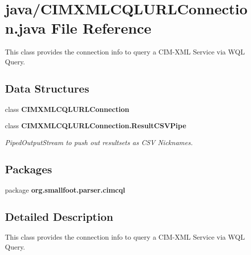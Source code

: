 \section{java/\+C\+I\+M\+X\+M\+L\+C\+Q\+L\+U\+R\+L\+Connection.java File Reference}
\label{CIMXMLCQLURLConnection_8java}


This class provides the connection info to query a C\+I\+M-\/\+X\+M\+L Service via W\+Q\+L Query.  


\subsection*{Data Structures}
\begin{DoxyCompactItemize}
\item 
class {\bf C\+I\+M\+X\+M\+L\+C\+Q\+L\+U\+R\+L\+Connection}
\item 
class {\bf C\+I\+M\+X\+M\+L\+C\+Q\+L\+U\+R\+L\+Connection.\+Result\+C\+S\+V\+Pipe}
\begin{DoxyCompactList}\small\item\em Piped\+Output\+Stream to push out resultsets as C\+S\+V Nicknames. \end{DoxyCompactList}\end{DoxyCompactItemize}
\subsection*{Packages}
\begin{DoxyCompactItemize}
\item 
package {\bf org.\+smallfoot.\+parser.\+cimcql}
\end{DoxyCompactItemize}


\subsection{Detailed Description}
This class provides the connection info to query a C\+I\+M-\/\+X\+M\+L Service via W\+Q\+L Query. 

